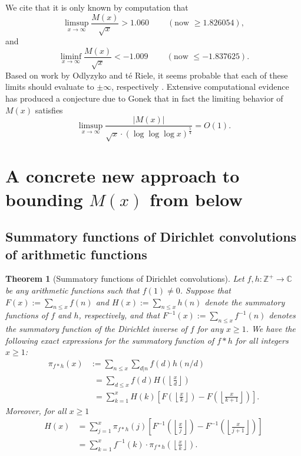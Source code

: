 \documentclass[11pt,reqno,a4letter]{article}
\numberwithin{figure}{section}
\numberwithin{table}{section}
\newcommand{\cf}{\textit{cf.\ }}
\newcommand{\seqnum}[1]{\href{http://oeis.org/#1}{\color{ProcessBlue}{\underline{#1}}}}
\newcommand{\Floor}[2]{\ensuremath{\left\lfloor \frac{#1}{#2} \right\rfloor}}
\theoremstyle{plain}
\newtheorem{theorem}{Theorem}
\numberwithin{theorem}{section}
\theoremstyle{definition}
\begin{document}
We cite that it is only known by computation 
that \cite[\cf \S 4.1]{PRIMEREC} 
\cite[\cf \seqnum{A051400}; \seqnum{A051401}]{OEIS} 
\[
\limsup_{x\rightarrow\infty} \frac{M(x)}{\sqrt{x}} > 1.060\ \qquad (\text{now } \geq 1.826054), 
\] 
and 
\[ 
\liminf_{x\rightarrow\infty} \frac{M(x)}{\sqrt{x}} < -1.009\ \qquad (\text{now } \leq -1.837625). 
\] 
Based on work by Odlyzyko and t\'{e} Riele, it seems probable that 
each of these limits should evaluate to $\pm \infty$, respectively 
\cite{ODLYZ-TRIELE,MREVISITED,ORDER-MERTENSFN,HURST-2017}. 
Extensive computational evidence has produced 
a conjecture due to Gonek that in fact the limiting behavior of 
$M(x)$ satisfies \cite{NG-MERTENS}
$$\limsup_{x \rightarrow \infty} \frac{|M(x)|}{\sqrt{x} \cdot (\log\log\log x)^{\frac{5}{4}}} = O(1).$$ 

\newpage 
\section{A concrete new approach to bounding $M(x)$ from below} 

\subsection{Summatory functions of Dirichlet convolutions of arithmetic functions} 

\begin{theorem}[Summatory functions of Dirichlet convolutions] 
\label{theorem_SummatoryFuncsOfDirCvls} 
Let $f,h: \mathbb{Z}^{+} \rightarrow \mathbb{C}$ be any arithmetic functions such that $f(1) \neq 0$. 
Suppose that $F(x) := \sum_{n \leq x} f(n)$ and $H(x) := \sum_{n \leq x} h(n)$ denote the summatory 
functions of $f$ and $h$, respectively, and that $F^{-1}(x) := \sum_{n \leq x} f^{-1}(n)$ 
denotes the summatory function of the 
Dirichlet inverse of $f$ for any $x \geq 1$. We have the following exact expressions for the 
summatory function of $f \ast h$ for all integers $x \geq 1$: 
\begin{align*} 
\pi_{f \ast h}(x) & := \sum_{n \leq x} \sum_{d|n} f(d) h(n/d) \\ 
     & \phantom{:}= \sum_{d \leq x} f(d) H\left(\Floor{x}{d}\right) \\ 
     & \phantom{:}= \sum_{k=1}^{x} H(k) \left[F\left(\Floor{x}{k}\right) - 
     F\left(\Floor{x}{k+1}\right)\right]. 
\end{align*} 
Moreover, for all $x \geq 1$ 
\begin{align*} 
H(x) & = \sum_{j=1}^{x} \pi_{f \ast h}(j) \left[F^{-1}\left(\Floor{x}{j}\right) - 
     F^{-1}\left(\Floor{x}{j+1}\right)\right] \\ 
     & = \sum_{k=1}^{x} f^{-1}(k) \cdot \pi_{f \ast h}\left(\Floor{x}{k}\right). 
\end{align*} 
\end{theorem} 
\end{document}
